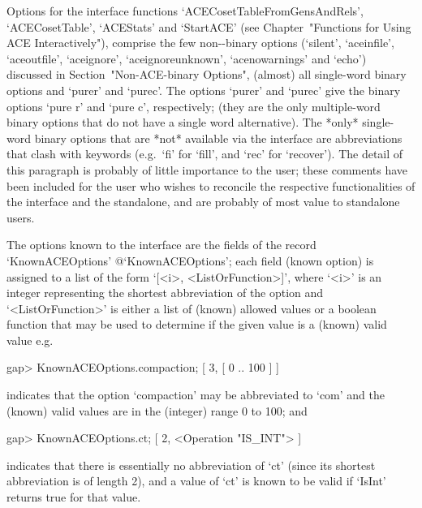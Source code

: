 Options      for      the       {\ACE}       interface       functions
`ACECosetTableFromGensAndRels',   `ACECosetTable',   `ACEStats'    and
`StartACE' (see  Chapter~"Functions  for  Using  ACE  Interactively"),
comprise the few  non-{\ACE}-binary  options  (`silent',  `aceinfile',
`aceoutfile',  `aceignore',  `aceignoreunknown',  `acenowarnings'  and
`echo') discussed in Section~"Non-ACE-binary  Options",  (almost)  all
single-word {\ACE} binary options and `purer' and `purec'. The options
`purer' and `purec' give the {\ACE} binary options `pure r' and  `pure
c', respectively; (they  are  the  only  multiple-word  {\ACE}  binary
options that do not  have  a  single  word  alternative).  The  *only*
single-word {\ACE} binary options that are  *not*  available  via  the
{\ACE} interface are abbreviations that  clash  with  {\GAP}  keywords
(e.g.~`fi' for `fill', and `rec' for `recover'). The  detail  of  this
paragraph is probably of little importance to the {\GAP}  user;  these
comments have been included for the user who wishes to  reconcile  the
respective functionalities of the  {\ACE}  interface  and  the  {\ACE}
standalone, and are probably of most value to standalone users.


The {\ACE} options known to the {\ACE} interface are the fields of the
record          `KnownACEOptions'{\undoquotes{}
{@`KnownACEOptions'}}; each field (known {\ACE} option) is assigned to
a list of the  form  `[<i>,  <ListOrFunction>]',  where  `<i>'  is  an
integer representing the  shortest  abbreviation  of  the  option  and
`<ListOrFunction>' is either a list of (known)  allowed  values  or  a
boolean function that may be used to determine if the given value is a
(known) valid value e.g.

\begintt
gap> KnownACEOptions.compaction;
[ 3, [ 0 .. 100 ] ]
\endtt

indicates that the option `compaction' may be  abbreviated  to  `com'
and the (known) valid values are in the (integer) range 0 to 100; and

\begintt
gap> KnownACEOptions.ct;
[ 2, <Operation "IS_INT"> ]
\endtt

indicates that there is essentially no abbreviation of `ct' (since its
shortest abbreviation is of length 2),  and a value of  `ct' is  known
to be valid if `IsInt' returns true for that value.


